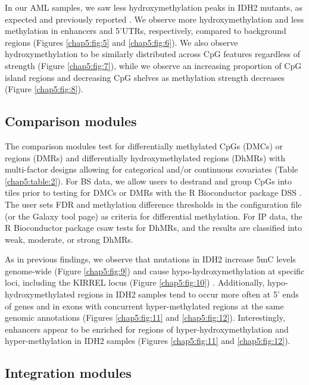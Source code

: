 In our AML samples, we saw less hydroxymethylation peaks in IDH2 mutants, as expected and previously reported \cite{Rampal:2014ka}. We observe more hydroxymethylation and less methylation in enhancers and 5'UTRs, respectively, compared to background regions (Figures \ref{chap5:fig:5} and \ref{chap5:fig:6}). We also observe hydroxymethylation to be similarly distributed across CpG features regardless of strength (Figure \ref{chap5:fig:7}), while we observe an increasing proportion of CpG island regions and decreasing CpG shelves as methylation strength decreases (Figure \ref{chap5:fig:8}).

\subsection{Comparison modules}
\label{mint_results_comparison}

The comparison modules test for differentially methylated CpGs (DMCs) or regions (DMRs) and differentially hydroxymethylated regions (DhMRs) with multi-factor designs allowing for categorical and/or continuous covariates (Table \ref{chap5:table:2}). For BS data, we allow users to destrand and group CpGs into tiles prior to testing for DMCs or DMRs with the R Bioconductor package DSS \cite{Wu:2016hq}. The user sets FDR and methylation difference thresholds in the configuration file (or the Galaxy tool page) as criteria for differential methylation. For IP data, the R Bioconductor package csaw \cite{Lun:2016jv} tests for DhMRs, and the results are classified into weak, moderate, or strong DhMRs.

As in previous findings, we observe that mutations in IDH2 increase 5mC levels genome-wide (Figure \ref{chap5:fig:9}) and cause hypo-hydroxymethylation at specific loci, including the KIRREL locus (Figure \ref{chap5:fig:10}) \cite{Rampal:2014ka}. Additionally, hypo-hydroxymethylated regions in IDH2 samples tend to occur more often at 5' ends of genes and in exons with concurrent hyper-methylated regions at the same genomic annotations (Figures \ref{chap5:fig:11} and \ref{chap5:fig:12}). Interestingly, enhancers appear to be enriched for regions of hyper-hydroxymethylation and hyper-methylation in IDH2 samples (Figures \ref{chap5:fig:11} and \ref{chap5:fig:12}).

\subsection{Integration modules}
\label{mint_results_integration}

